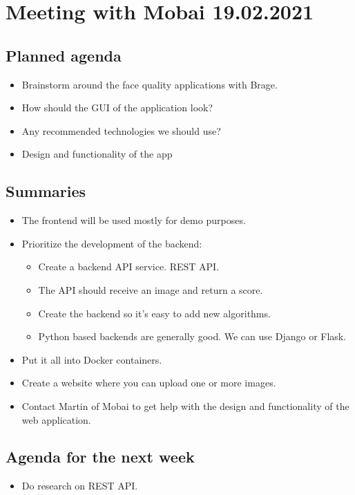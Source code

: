 \newpage

\section*{Meeting with Mobai 19.02.2021}
\subsection*{Planned agenda}
\begin{itemize}
    \item Brainstorm around the face quality applications with Brage.
    \item How should the GUI of the application look?
    \item Any recommended technologies we should use?
    \item Design and functionality of the app
\end{itemize}

\subsection*{Summaries}
\begin{itemize}
    \item The frontend will be used mostly for demo purposes.
    \item Prioritize the development of the backend:
    \begin{itemize}
        \item Create a backend API service. REST API.
        \item The API should receive an image and return a score.
        \item Create the backend so it’s easy to add new algorithms.
        \item Python based backends are generally good. We can use Django or Flask.
    \end{itemize}
    \item Put it all into Docker containers.
    \item Create a website where you can upload one or more images.
    \item Contact Martin of Mobai to get help with the design and functionality of the web application.
\end{itemize}

\subsection*{Agenda for the next week}
\begin{itemize}
    \item Do research on REST API.
\end{itemize}

